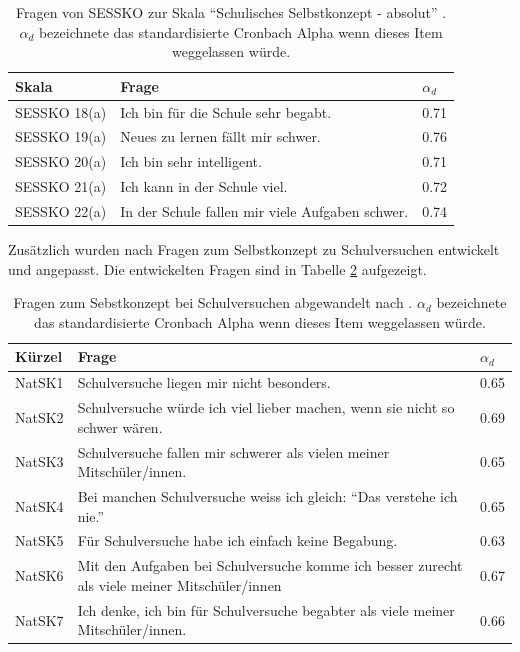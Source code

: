 \begin{table}[htbp]
  \centering
\begin{tabular}{p{3cm}p{9cm}p{1cm}}
\toprule Skala & Frage & $\alpha_d$  \\ 
\midrule SESSKO 18(a) & Ich bin für die Schule sehr begabt. &  0.71  \\ 
 SESSKO 19(a) & Neues zu lernen fällt mir schwer.  &  0.76 \\ 
 SESSKO 20(a) & Ich bin sehr intelligent. &  0.71  \\ 
 SESSKO 21(a) & Ich kann in der Schule viel. &  0.72   \\ 
 SESSKO 22(a) & In der Schule fallen mir viele Aufgaben schwer.  & 0.74   \\ 
\bottomrule 
\end{tabular} 
  \caption{Fragen von SESSKO zur Skala "`Schulisches Selbstkonzept - absolut"'  \citep{Schone2002}. $\alpha_d$ bezeichnete das standardisierte Cronbach Alpha wenn dieses Item weggelassen würde.}
  \label{tab:SESSKO}
\end{table}

Zusätzlich wurden nach \citet{Dierks2014} Fragen zum Selbstkonzept zu Schulversuchen entwickelt und angepasst. Die entwickelten Fragen sind in Tabelle \ref{tab:NatSK} aufgezeigt.

\begin{table}[htbp]
  \centering
\begin{tabular}{p{2cm}p{10cm}p{1cm}}
\toprule Kürzel & Frage & $\alpha_d$  \\ 
\midrule NatSK1 & Schulversuche liegen mir nicht besonders. &  0.65  \\ 
 NatSK2 & Schulversuche würde ich viel lieber machen, wenn sie nicht so schwer wären.  &  0.69 \\ 
 NatSK3 & Schulversuche fallen mir schwerer als vielen meiner Mitschüler/innen. &  0.65  \\ 
 NatSK4 & Bei manchen Schulversuche weiss ich gleich: "`Das verstehe ich nie."' &  0.65   \\ 
 NatSK5 & Für Schulversuche habe ich einfach keine Begabung.   & 0.63   \\ 
 NatSK6 & Mit den Aufgaben bei Schulversuche komme ich besser zurecht als viele meiner Mitschüler/innen  & 0.67   \\ 
 NatSK7 & Ich denke, ich bin für Schulversuche begabter als viele meiner Mitschüler/innen.  & 0.66   \\ 
\bottomrule 
\end{tabular} 
  \caption{Fragen zum Sebstkonzept bei Schulversuchen abgewandelt nach \citet{Dierks2014}. $\alpha_d$ bezeichnete das standardisierte Cronbach Alpha wenn dieses Item weggelassen würde.}
  \label{tab:NatSK}
\end{table}

